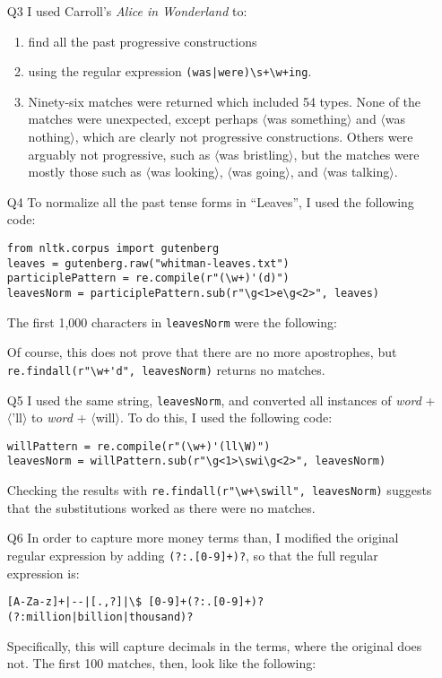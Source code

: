 \documentclass{article}
\newcommand{\orth}[1]{$\langle$#1$\rangle$}
\begin{document}
\begin{itemize}
\begin{enumerate}
      \end{enumerate}
      In each case, there were at least some matches that did not involve affixes. Despite asking for at least two word characters before \orth{er} in (1), \orth{her} was still matched. For (2), there was only one match and it did not involve an affix: \orth{apartment}. For (4), a proper name was even matched: \orth{ally sheedy}. However, many matches did fit the criteria, such as \orth{closer}, \orth{unhappy}, and \orth{tightly written}.
    \item[Q3] I used Carroll's \emph{Alice in Wonderland} to:
      \begin{enumerate}
        \item find all the past progressive constructions
        \item using the regular expression \lstinline!(was|were)\s+\w+ing!.
        \item Ninety-six matches were returned which included 54 types. None of the matches were unexpected, except perhaps \orth{was something} and \orth{was nothing}, which are clearly not progressive constructions. Others were arguably not progressive, such as \orth{was bristling}, but the matches were mostly those such as \orth{was looking}, \orth{was going}, and \orth{was talking}.
      \end{enumerate}
    \item[Q4] To normalize all the past tense forms in ``Leaves'', I used the following code:
      \begin{lstlisting}
from nltk.corpus import gutenberg
leaves = gutenberg.raw("whitman-leaves.txt")
participlePattern = re.compile(r"(\w+)'(d)")
leavesNorm = participlePattern.sub(r"\g<1>e\g<2>", leaves)
      \end{lstlisting}
      The first 1,000 characters in \texttt{leavesNorm} were the following:
      
      Of course, this does not prove that there are no more apostrophes, but \lstinline!re.findall(r"\w+'d", leavesNorm)! returns no matches.
    \item[Q5] I used the same string, \texttt{leavesNorm}, and converted all instances of \emph{word} + \orth{'ll} to \emph{word} + \orth{will}. To do this, I used the following code:
      \begin{lstlisting}
willPattern = re.compile(r"(\w+)'(ll\W)")
leavesNorm = willPattern.sub(r"\g<1>\swi\g<2>", leavesNorm)
      \end{lstlisting}
      Checking the results with \lstinline!re.findall(r"\w+\swill", leavesNorm)! suggests that the substitutions worked as there were no matches.
    \item[Q6] In order to capture more money terms than, I modified the original regular expression by adding \lstinline!(?:.[0-9]+)?!, so that the full regular expression is:
      \begin{lstlisting}
[A-Za-z]+|--|[.,?]|\$ [0-9]+(?:.[0-9]+)? (?:million|billion|thousand)?
      \end{lstlisting}
      Specifically, this will capture decimals in the terms, where the original does not. The first 100 matches, then, look like the following:
      
  \end{itemize}
\end{document}
